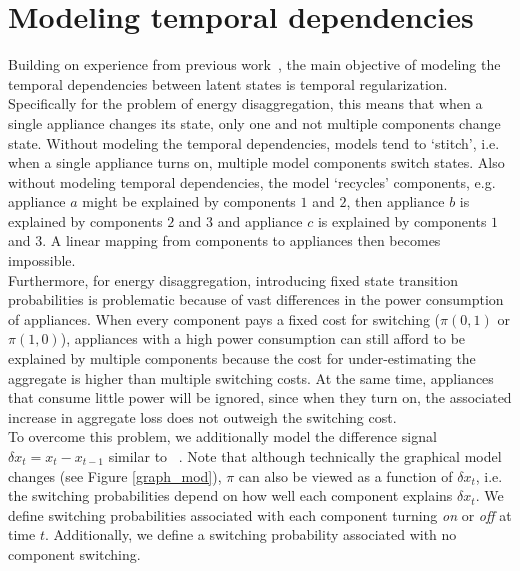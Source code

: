 \section{Modeling temporal dependencies}
Building on experience from previous work~\cite{lange2016bolt}, the main objective of modeling the temporal dependencies between latent states is temporal regularization. Specifically for the problem of energy disaggregation, this means that when a single appliance changes its state, only one and not multiple components change state. Without modeling the temporal dependencies, models tend to `stitch', i.e. when a single appliance turns on, multiple model components switch states. Also without modeling temporal dependencies, the model `recycles' components, e.g. appliance $a$ might be explained by components $1$ and $2$, then appliance $b$ is explained by components $2$ and $3$ and appliance $c$ is explained by components $1$ and $3$. A linear mapping from components to appliances then becomes impossible.\\
Furthermore, for energy disaggregation, introducing fixed state transition probabilities is problematic because of vast differences in the power consumption of appliances. When every component pays a fixed cost for switching ($\pi(0,1)$ or $\pi(1,0)$), appliances with a high power consumption can still afford to be explained by multiple components because the cost for under-estimating the aggregate is higher than multiple switching costs. At the same time, appliances that consume little power will be ignored, since when they turn on, the associated increase in aggregate loss does not outweigh the switching cost.\\
To overcome this problem, we additionally model the difference signal $\delta x_t = x_t - x_{t-1}$ similar to ~\cite{kolter2012fhmm}. Note that although technically the graphical model changes (see Figure \ref{graph_mod}), $\pi$ can also be viewed as a function of $\delta x_t$, i.e. the switching probabilities depend on how well each component explains $\delta x_t$. We define switching probabilities associated with each component turning \emph{on} or \emph{off} at time $t$. Additionally, we define a switching probability associated with no component switching.

